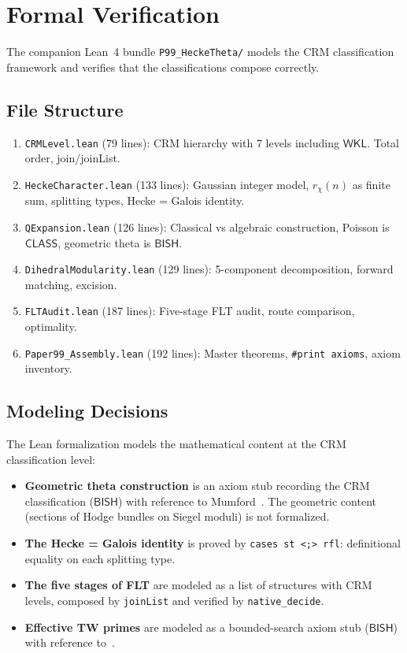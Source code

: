 \documentclass[11pt,a4paper]{article}
\theoremstyle{plain}
\theoremstyle{definition}
\newcommand{\BISH}{\textsf{BISH}}
\newcommand{\WKL}{\textsf{WKL}}
\newcommand{\CLASS}{\textsf{CLASS}}
\begin{document}
\section{Formal Verification}\label{sec:formal}

The companion Lean~4 bundle \texttt{P99\_HeckeTheta/} models the CRM classification framework and verifies that the classifications compose correctly.

\subsection{File Structure}

\begin{enumerate}[leftmargin=2.5em]
\item \texttt{CRMLevel.lean} (79 lines): CRM hierarchy with 7 levels including $\WKL$. Total order, join/joinList.
\item \texttt{HeckeCharacter.lean} (133 lines): Gaussian integer model, $r_\chi(n)$ as finite sum, splitting types, Hecke = Galois identity.
\item \texttt{QExpansion.lean} (126 lines): Classical vs algebraic construction, Poisson is $\CLASS$, geometric theta is $\BISH$.
\item \texttt{DihedralModularity.lean} (129 lines): 5-component decomposition, forward matching, excision.
\item \texttt{FLTAudit.lean} (187 lines): Five-stage FLT audit, route comparison, optimality.
\item \texttt{Paper99\_Assembly.lean} (192 lines): Master theorems, \texttt{\#print axioms}, axiom inventory.
\end{enumerate}

\subsection{Modeling Decisions}

The Lean formalization models the mathematical content at the CRM classification level:
\begin{itemize}
\item \textbf{Geometric theta construction} is an axiom stub recording the CRM classification ($\BISH$) with reference to Mumford~\cite{mumford66}. The geometric content (sections of Hodge bundles on Siegel moduli) is not formalized.
\item \textbf{The Hecke = Galois identity} is proved by \texttt{cases st <;> rfl}: definitional equality on each splitting type.
\item \textbf{The five stages of FLT} are modeled as a list of structures with CRM levels, composed by \texttt{joinList} and verified by \texttt{native\_decide}.
\item \textbf{Effective TW primes} are modeled as a bounded-search axiom stub ($\BISH$) with reference to~\cite{lagarias-odlyzko77}.
\end{itemize}
\end{document}
